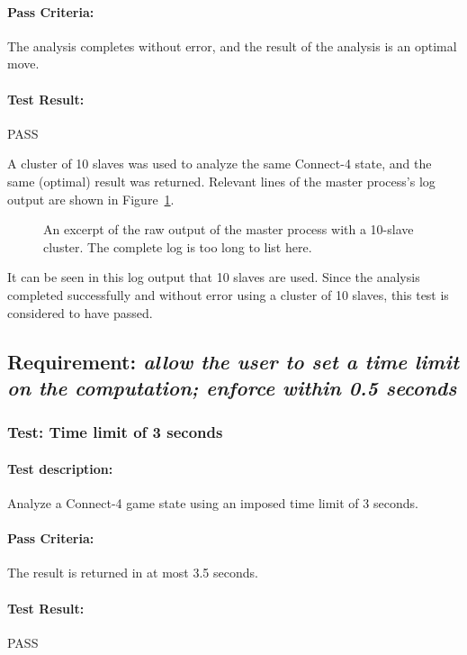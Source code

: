\documentclass[pdftex,12pt,a4paper]{article}
\begin{document}
\paragraph{Pass Criteria:} The analysis completes without error, and the result of the analysis is an optimal move.

\paragraph{Test Result:} PASS

A cluster of 10 slaves was used to analyze the same Connect-4 state, and the same (optimal) result was returned. Relevant lines of the master process's log output are shown in Figure~\ref{fig:master-3}.

\begin{figure}[h]

\caption{An excerpt of the raw output of the master process with a 10-slave cluster. The complete log is too long to list here.}
\label{fig:master-3}
\end{figure}

It can be seen in this log output that 10 slaves are used. Since the analysis completed successfully and without error using a cluster of 10 slaves, this test is considered to have passed.

\subsection{\textbf{Requirement:} \emph{allow the user to set a time limit on the computation; enforce within 0.5 seconds}}

\subsubsection{\textbf{Test:} Time limit of 3 seconds}

\paragraph{Test description:} Analyze a Connect-4 game state using an imposed time limit of 3 seconds. 

\paragraph{Pass Criteria:} The result is returned in at most 3.5 seconds.

\paragraph{Test Result:} PASS
\end{document}

